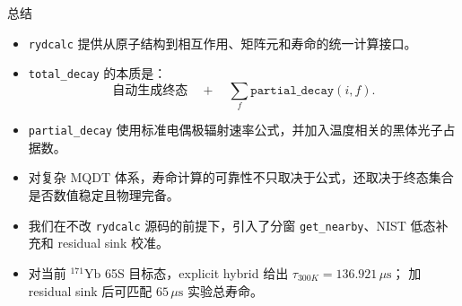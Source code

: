 \documentclass[aspectratio=169,11pt]{ctexbeamer}
\begin{document}
\begin{frame}{总结}
  \begin{itemize}
    \item \texttt{rydcalc} 提供从原子结构到相互作用、矩阵元和寿命的统一计算接口。
    \item \texttt{total\_decay} 的本质是：
      \[
        \text{自动生成终态}\quad+\quad
        \sum_f \texttt{partial\_decay}(i,f).
      \]
    \item \texttt{partial\_decay} 使用标准电偶极辐射速率公式，并加入温度相关的黑体光子占据数。
    \item 对复杂 MQDT 体系，寿命计算的可靠性不只取决于公式，还取决于终态集合是否数值稳定且物理完备。
    \item 我们在不改 \texttt{rydcalc} 源码的前提下，引入了分窗 \texttt{get\_nearby}、NIST 低态补充和 residual sink 校准。
    \item 对当前 \({}^{171}\mathrm{Yb}\) 65S 目标态，explicit hybrid 给出
      \(\tau_{300K}=136.921\,\mu\mathrm{s}\)；
      加 residual sink 后可匹配 \(65\,\mu\mathrm{s}\) 实验总寿命。
  \end{itemize}
\end{frame}
\end{document}
